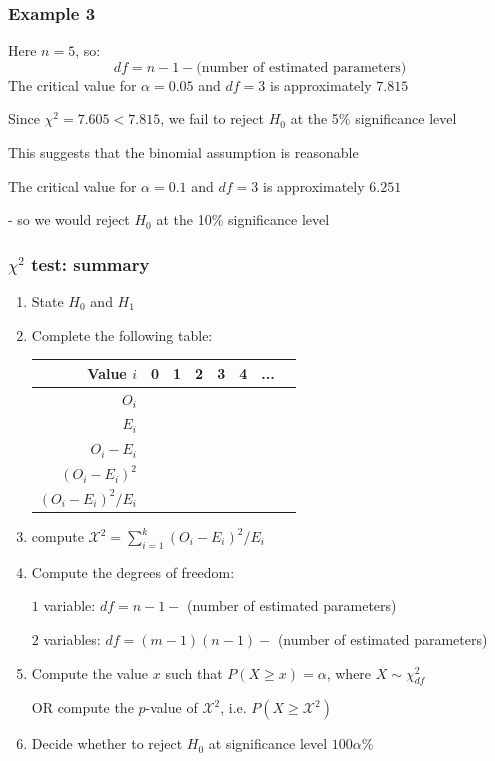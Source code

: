 \documentclass[t,8pt]{beamer}%
\begin{document}
\begin{frame}
    \frametitle{Example 3}
    Here $n=5$, so:
    \[
    df = n - 1 - \text{(number of estimated parameters)}
    \]
    The critical value for \( \alpha = 0.05 \) and \( df = 3 \) is approximately $7.815$ \par
    Since \( \chi^2 = 7.605 < 7.815 \), we fail to reject \( H_0 \) at the 5\% significance level \par
    This suggests that the binomial assumption is reasonable \par
    The critical value for \( \alpha = 0.1 \) and \( df = 3 \) is approximately $6.251$ \par
    - so we would reject $H_0$ at the 10\% significance level
\end{frame}

\begin{frame}
    \frametitle{$\chi^2$ test: summary}
    \begin{enumerate}
    \item State $H_0$ and $H_1$
    \item Complete the following table:
    \begin{center}
    \begin{tabular}{ r || c | c | c | c | c | c | c|}
    Value $i$ & 0 & 1 & 2 & 3 & 4 & ...\\ \hline
    $O_i$ &  &  &  &  &  &  \\ \hline
    $E_i$ &  &  &  &  &  &  \\ \hline
    $O_i-E_i$ &  &  &  &  &  &  \\ \hline
    $(O_i-E_i)^2$ &  &  &  &  &  &  \\ \hline
    $(O_i-E_i)^2/E_i$ &  &  &  &  &  &  \\ \hline
    \end{tabular}
    \end{center}
    \item compute $\mathcal{X}^2=\sum_{i=1}^k(O_i-E_i)^2/E_i$
    \item Compute the degrees of freedom: \par
    $1$ variable: $df = n - 1 -$ (number of estimated parameters) \par
    $2$ variables: $df = (m-1)(n-1) -$ (number of estimated parameters) \par
    \item Compute the value $x$ such that $P(X\geq x)=\alpha$, where $X\sim\chi^2_{df}$ \par
    OR compute the $p$-value of $\mathcal{X}^2$, i.e. $P(X\geq \mathcal{X}^2)$
    \item Decide whether to reject $H_0$ at significance level $100\alpha\%$
\end{enumerate}
\end{frame}
\end{document}

